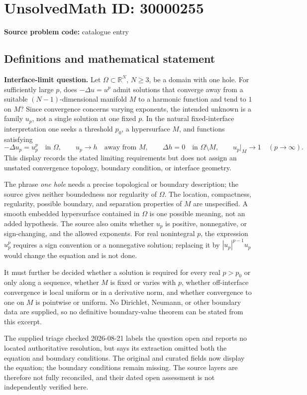 \documentclass[11pt]{article}
\newcommand{\R}{\mathbb{R}}
\begin{document}
\section*{UnsolvedMath ID: 30000255}
\textbf{Source problem code:} catalogue entry
\subsection{Definitions and mathematical statement}
\textbf{Interface-limit question.} Let \(\Omega\subset\R^N\), \(N\ge3\), be a domain with one hole. For sufficiently large \(p\), does \(-\Delta u=u^p\) admit solutions that converge away from a suitable \((N-1)\)-dimensional manifold \(M\) to a harmonic function and tend to \(1\) on \(M\)? Since convergence concerns varying exponents, the intended unknown is a family \(u_p\), not a single solution at one fixed \(p\). In the natural fixed-interface interpretation one seeks a threshold \(p_0\), a hypersurface \(M\), and functions satisfying\[-\Delta u_p=u_p^p\quad\text{in }\Omega,\qquad u_p\longrightarrow h\quad\text{away from }M,\qquad \Delta h=0\quad\text{in }\Omega\setminus M,\qquad u_p|_M\longrightarrow1\quad(p\to\infty).\] This display records the stated limiting requirements but does not assign an unstated convergence topology, boundary condition, or interface geometry.\par The phrase \emph{one hole} needs a precise topological or boundary description; the source gives neither boundedness nor regularity of \(\Omega\). The location, compactness, regularity, possible boundary, and separation properties of \(M\) are unspecified. A smooth embedded hypersurface contained in \(\Omega\) is one possible meaning, not an added hypothesis. The source also omits whether \(u_p\) is positive, nonnegative, or sign-changing, and the allowed exponents. For real nonintegral \(p\), the expression \(u_p^p\) requires a sign convention or a nonnegative solution; replacing it by \(|u_p|^{p-1}u_p\) would change the equation and is not done.\par It must further be decided whether a solution is required for every real \(p>p_0\) or only along a sequence, whether \(M\) is fixed or varies with \(p\), whether off-interface convergence is local uniform or in a derivative norm, and whether convergence to one on \(M\) is pointwise or uniform. No Dirichlet, Neumann, or other boundary data are supplied, so no definitive boundary-value theorem can be stated from this excerpt.\par The supplied triage checked 2026-08-21 labels the question open and reports no located authoritative resolution, but says its extraction omitted both the equation and boundary conditions. The original and curated fields now display the equation; the boundary conditions remain missing. The source layers are therefore not fully reconciled, and their dated open assessment is not independently verified here.
\end{document}
